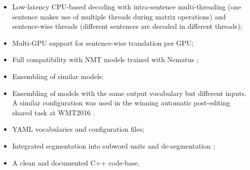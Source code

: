 \documentclass[11pt]{article}
\begin{document}
\begin{itemize}
 \item Low-latency CPU-based decoding with intra-sentence multi-threading (one sentence makes use of multiple threads during matrix operations) and sentence-wise threads (different sentences are decoded in different threads);
 \item Multi-GPU support for sentence-wise translation per GPU;
 \item Full compatibility with NMT models trained with Nematus \cite{DBLP:conf/wmt/SennrichHB16};
 \item Ensembling of similar models;
 \item Ensembling of models with the same output vocabulary but different inputs. A similar configuration was used in the winning automatic post-editing shared task at WMT2016 \cite{DBLP:journals/corr/Junczys-Dowmunt16}.
 \item YAML vocabularies and configuration files; %
 \item Integrated segmentation into subword units and de-segmentation \cite{DBLP:journals/corr/SennrichHB15};
 \item A clean and documented C++ code-base.
\end{itemize}
\end{document}
